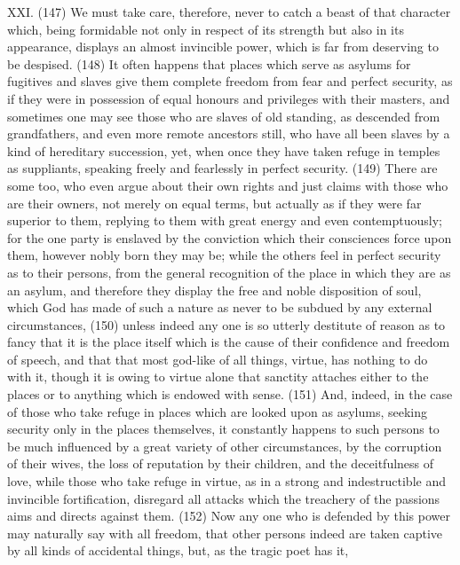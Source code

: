 XXI. (147) We must take care, therefore, never to catch a beast of that character which, being
formidable not only in respect of its strength but also in its appearance, displays an almost
invincible power, which is far from deserving to be despised. (148) It often happens that places
which serve as asylums for fugitives and slaves give them complete freedom from fear and perfect
security, as if they were in possession of equal honours and privileges with their masters, and
sometimes one may see those who are slaves of old standing, as descended from grandfathers,
and even more remote ancestors still, who have all been slaves by a kind of hereditary
succession, yet, when once they have taken refuge in temples as suppliants, speaking freely and
fearlessly in perfect security. (149) There are some too, who even argue about their own rights
and just claims with those who are their owners, not merely on equal terms, but actually as if they
were far superior to them, replying to them with great energy and even contemptuously; for the one
party is enslaved by the conviction which their consciences force upon them, however nobly born
they may be; while the others feel in perfect security as to their persons, from the general
recognition of the place in which they are as an asylum, and therefore they display the free and
noble disposition of soul, which God has made of such a nature as never to be subdued by any
external circumstances, (150) unless indeed any one is so utterly destitute of reason as to fancy
that it is the place itself which is the cause of their confidence and freedom of speech, and that that
most god-like of all things, virtue, has nothing to do with it, though it is owing to virtue alone that
sanctity attaches either to the places or to anything which is endowed with sense. (151) And,
indeed, in the case of those who take refuge in places which are looked upon as asylums, seeking
security only in the places themselves, it constantly happens to such persons to be much
influenced by a great variety of other circumstances, by the corruption of their wives, the loss of
reputation by their children, and the deceitfulness of love, while those who take refuge in virtue, as
in a strong and indestructible and invincible fortification, disregard all attacks which the treachery of
the passions aims and directs against them. (152) Now any one who is defended by this power
may naturally say with all freedom, that other persons indeed are taken captive by all kinds of
accidental things, but, as the tragic poet has it,


